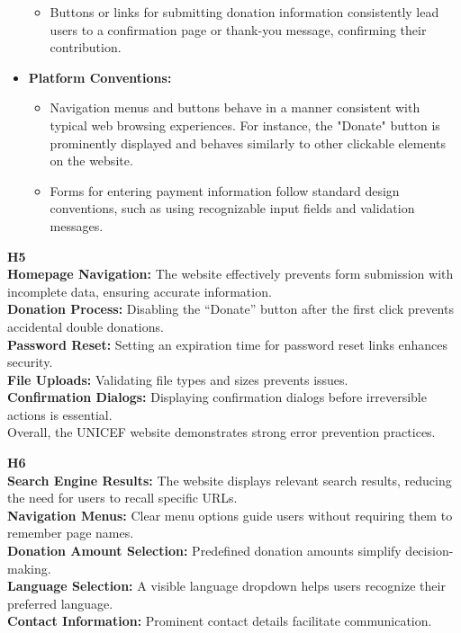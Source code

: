 \documentclass{article}
\begin{document}
\begin{description}
\begin{itemize}
\begin{itemize}
            \item Buttons or links for submitting donation information consistently lead users to a confirmation page or thank-you message, confirming their contribution.
        \end{itemize}
        \item \textbf{Platform Conventions:}
        \begin{itemize}
            \item Navigation menus and buttons behave in a manner consistent with typical web browsing experiences. For instance, the "Donate" button is prominently displayed and behaves similarly to other clickable elements on the website.
            \item Forms for entering payment information follow standard design conventions, such as using recognizable input fields and validation messages.
        \end{itemize}
    \end{itemize}
    \item {\textbf{H5} \color{unicefGray}{Error prevention}}\\
    \textbf{Homepage Navigation:} The website effectively prevents form submission with incomplete data, ensuring accurate information.\\
    \textbf{Donation Process:} Disabling the “Donate” button after the first click prevents accidental double donations.\\
    \textbf{Password Reset:} Setting an expiration time for password reset links enhances security.\\
    \textbf{File Uploads:} Validating file types and sizes prevents issues.\\
    \textbf{Confirmation Dialogs:} Displaying confirmation dialogs before irreversible actions is essential.\\
    Overall, the UNICEF website demonstrates strong error prevention practices.
    \item {\textbf{H6} \color{unicefGray}{Recognition rather than recall}}\\
    \textbf{Search Engine Results:} The website displays relevant search results, reducing the need for users to recall specific URLs.\\
    \textbf{Navigation Menus:} Clear menu options guide users without requiring them to remember page names.\\
    \textbf{Donation Amount Selection:} Predefined donation amounts simplify decision-making.\\
    \textbf{Language Selection:} A visible language dropdown helps users recognize their preferred language.\\
    \textbf{Contact Information:} Prominent contact details facilitate communication.
\end{description}
\end{document}

